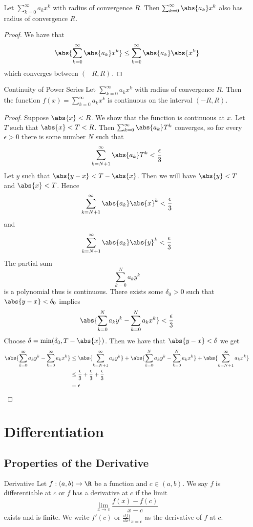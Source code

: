 \begin{prp}{}{} Let $\sum_{k=0}^{\infty}a_kx^k$ with radius of convergence $R$. Then $\sum_{k=0}^{\infty}\abs{a_k}x^k$ also has radius of convergence $R$. \tcbline
\begin{proof} We have that $$\abs{\sum_{k=0}^{\infty}\abs{a_k}x^k}\leq\sum_{k=0}^{\infty}\abs{a_k}\abs{x^k}$$ which converges between $(-R,R)$. 
\end{proof}
\end{prp}

\begin{thm}{Continuity of Power Series}{} Let $\sum_{k=0}^{\infty}a_kx^k$ with radius of convergence $R$. Then the function $f(x)=\sum_{k=0}^{\infty}a_kx^k$ is continuous on the interval $(-R,R)$. \tcbline
\begin{proof} Suppose $\abs{x}<R$. We show that the function is continuous at $x$. Let $T$ such that $\abs{x}<T<R$. Then $\sum_{k=0}^\infty\abs{a_k}T^k$ converges, so for every $\epsilon>0$ there is some number $N$ such that $$\sum_{k=N+1}^\infty\abs{a_k}T^k<\frac{\epsilon}{3}$$ Let $y$ such that $\abs{y-x}<T-\abs{x}$. Then we will have $\abs{y}<T$ and $\abs{x}<T$. Hence $$\sum_{k=N+1}^\infty\abs{a_k}\abs{x}^k<\frac{\epsilon}{3}$$ and $$\sum_{k=N+1}^\infty\abs{a_k}\abs{y}^k<\frac{\epsilon}{3}$$ The partial sum $$\sum_{k=0}^Na_ky^k$$ is a polynomial thus is continuous. There exists some $\delta_0>0$ such that $\abs{y-x}<\delta_0$ implies $$\abs{\sum_{k=0}^Na_ky^k-\sum_{k=0}^Na_kx^k}<\frac{\epsilon}{3}$$ Choose $\delta=\min(\delta_0,T-\abs{x})$. Then we have that $\abs{y-x}<\delta$ we get 
\begin{align*}
\abs{\sum_{k=0}^\infty a_ky^k-\sum_{k=0}^\infty a_kx^k}&\leq\abs{\sum_{k=N+1}^\infty a_ky^k}+\abs{\sum_{k=0}^Na_ky^k-\sum_{k=0}^Na_kx^k}+\abs{\sum_{k=N+1}^\infty a_kx^k}\\
&\leq\frac{\epsilon}{3}+\frac{\epsilon}{3}+\frac{\epsilon}{3}\\
&=\epsilon
\end{align*}
\end{proof}
\end{thm}

\pagebreak
\section{Differentiation}
\subsection{Properties of the Derivative}
\begin{defn}{Derivative}{} Let $f:(a,b)\to\R$ be a function and $c\in(a,b)$. We say $f$ is differentiable at $c$ or $f$ has a derivative at $c$ if the limit $$\lim_{x\to c}\frac{f(x)-f(c)}{x-c}$$ exists and is finite. We write $f'(c)$ or $\frac{df}{dx}\vert_{x=c}$ as the derivative of $f$ at $c$. 
\end{defn}

